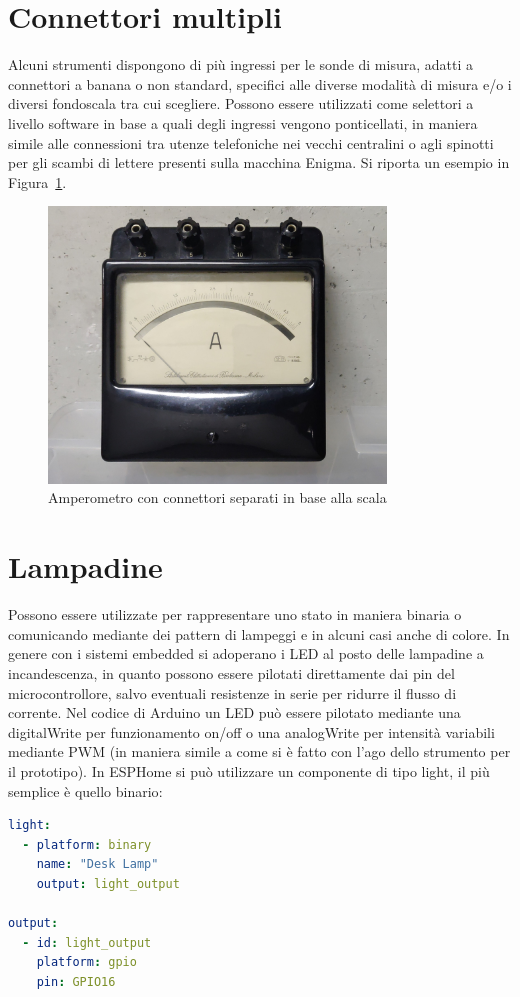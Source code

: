 \documentclass[12pt,a4paper]{report}
\begin{document}
\section{Connettori multipli}
Alcuni strumenti dispongono di più ingressi per le sonde di misura, adatti a connettori a banana o non standard, specifici alle
diverse modalità di misura e/o i diversi fondoscala tra cui scegliere. Possono essere utilizzati come selettori a livello software in base a
quali degli ingressi vengono ponticellati, in maniera simile alle connessioni tra utenze telefoniche nei vecchi centralini o agli spinotti per
gli scambi di lettere presenti sulla macchina Enigma. Si riporta un esempio in Figura~\ref{fig:connettorimultipli}.

\begin{figure}[h]
  \centering
  \includegraphics[width=0.8\textwidth]{connettorimultipli}
  \caption{Amperometro con connettori separati in base alla scala}
  \label{fig:connettorimultipli}
\end{figure}

\section{Lampadine}
Possono essere utilizzate per rappresentare uno stato in maniera binaria o comunicando mediante dei pattern di lampeggi e in alcuni
casi anche di colore.
In genere con i sistemi embedded si adoperano i LED al posto delle lampadine a incandescenza, in quanto possono essere pilotati
direttamente dai pin del microcontrollore, salvo eventuali resistenze in serie per ridurre il flusso di corrente.
Nel codice di Arduino un LED può essere pilotato mediante una digitalWrite per funzionamento on/off o una analogWrite per
intensità variabili mediante PWM (in maniera simile a come si è fatto con l'ago dello strumento per il prototipo).
In ESPHome si può utilizzare un componente di tipo light, il più semplice è quello binario\cite{esphomeio}:
\begin{lstlisting}[language=yaml]
light:
  - platform: binary
    name: "Desk Lamp"
    output: light_output

output:
  - id: light_output
    platform: gpio
    pin: GPIO16
\end{lstlisting}
\end{document}
